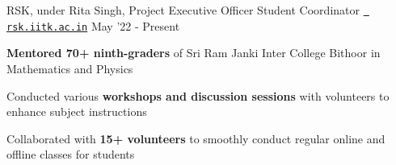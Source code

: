 
\begin{cventries}
    \cventry
  {RSK, under Rita Singh, Project Executive Officer}
  {Student Coordinator}
  {\texttt{\href{https://rsk.iitk.ac.in/}{\faGlobe{} rsk.iitk.ac.in}}}
  {May '22 - Present}
  {
    \begin{cvitems}
    \item \textbf{Mentored 70+ ninth-graders} of Sri Ram Janki Inter College Bithoor in Mathematics and Physics
    \item Conducted various \textbf{workshops and discussion sessions} with volunteers to enhance subject instructions
    \item Collaborated with \textbf{15+ volunteers} to smoothly conduct regular online and offline classes for students
    \end{cvitems}
  }
\end{cventries}
\vspace{-2mm}



\vspace{2mm}